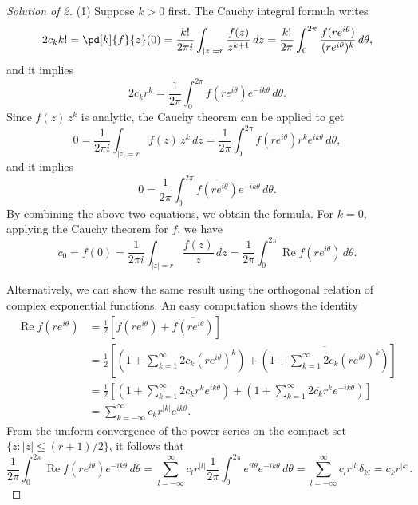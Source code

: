 \documentclass[a4paper]{article}
\theoremstyle{definition}
\renewcommand{\Re}{\operatorname{Re}}
\renewcommand{\bar}{\overline}
\begin{document}
\newpage
\begin{proof}[Solution of 2]
(1)
Suppose $k>0$ first.
The Cauchy integral formula writes
\begin{align*}
2c_kk!=\pd[k]{f}{z}(0)=\frac{k!}{2\pi i}\int_{|z|=r}\frac{f(z)}{z^{k+1}}\,dz=\frac{k!}{2\pi}\int_0^{2\pi}\frac{f(re^{i\theta})}{(re^{i\theta})^k}\,d\theta,
\end{align*}
and it implies
\[2c_kr^k=\frac1{2\pi}\int_0^{2\pi}f(re^{i\theta})e^{-ik\theta}\,d\theta.\]
Since $f(z)\,z^k$ is analytic, the Cauchy theorem can be applied to get
\[0=\frac1{2\pi i}\int_{|z|=r}f(z)\,z^k\,dz=\frac1{2\pi}\int_0^{2\pi}f(re^{i\theta})r^ke^{ik\theta}\,d\theta,\]
and it implies
\[0=\frac1{2\pi}\int_0^{2\pi}\bar{f(re^{i\theta})}e^{-ik\theta}\,d\theta.\]
By combining the above two equations, we obtain the formula.
For $k=0$, applying the Cauchy theorem for $f$, we have
\[c_0=f(0)=\frac1{2\pi i}\int_{|z|=r}\frac{f(z)}z\,dz=\frac1{2\pi}\int_0^{2\pi}\Re f(re^{i\theta})\,d\theta.\]

Alternatively, we can show the same result using the orthogonal relation of complex exponential functions.
An easy computation shows the identity
\begin{align*}
\Re f(re^{i\theta})
&=\frac12[f(re^{i\theta})+\bar{f(re^{i\theta})}]\\
&=\frac12\left[\left(1+\sum_{k=1}^\infty2c_k(re^{i\theta})^k\right)+\bar{\left(1+\sum_{k=1}^\infty2c_k(re^{i\theta})^k\right)}\right]\\
&=\frac12\left[\left(1+\sum_{k=1}^\infty2c_kr^ke^{ik\theta}\right)+\left(1+\sum_{k=1}^\infty2\bar{c_k}r^ke^{-ik\theta}\right)\right]\\
&=\sum_{k=-\infty}^\infty c_kr^{|k|}e^{ik\theta}.
\end{align*}
From the uniform convergence of the power series on the compact set $\{z:|z|\le(r+1)/2\}$, it follows that
\[\frac1{2\pi}\int_0^{2\pi}\Re f(re^{i\theta})e^{-ik\theta}\,d\theta=\sum_{l=-\infty}^{\infty}c_lr^{|l|}\frac1{2\pi}\int_0^{2\pi}e^{il\theta}e^{-ik\theta}\,d\theta=\sum_{l=-\infty}^{\infty}c_lr^{|l|}\delta_{kl}=c_kr^{|k|}.\]


\end{proof}
\end{document}
